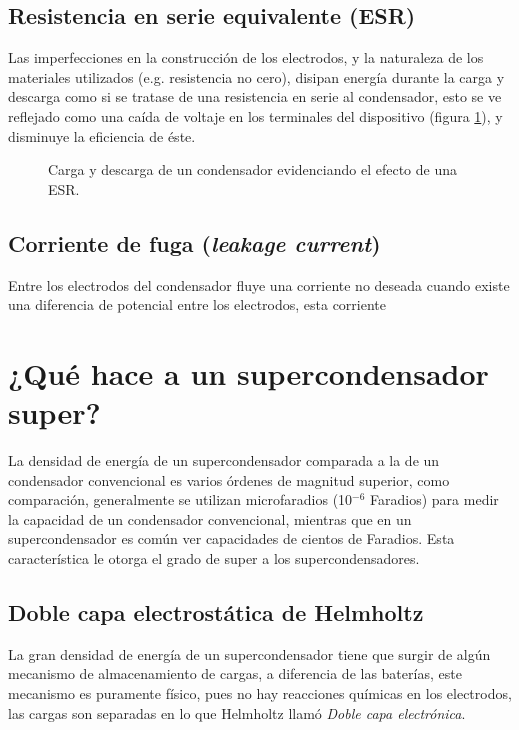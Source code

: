 \subsection{Resistencia en serie equivalente (ESR)}
Las imperfecciones en la construcción de los electrodos, y la naturaleza de los materiales utilizados (e.g. resistencia no cero), disipan energía durante la carga y descarga como si se tratase de una resistencia en serie al condensador, esto se ve reflejado como una caída de voltaje en los terminales del dispositivo (figura \ref{fig:plot:charge-discharge_esr}), y disminuye la eficiencia de éste.

\begin{figure}[h!]
	\caption{Carga y descarga de un condensador evidenciando el efecto de una ESR.}
	\label{fig:plot:charge-discharge_esr}
\end{figure}

\subsection{Corriente de fuga (\emph{leakage current})}
Entre los electrodos del condensador fluye una corriente no deseada cuando existe una diferencia de potencial entre los electrodos, esta corriente 

\section{¿Qué hace a un supercondensador super?}
La densidad de energía de un supercondensador comparada a la de un condensador convencional es varios órdenes de magnitud superior, como comparación, generalmente se utilizan microfaradios (10$^{-6}$ Faradios) para medir la capacidad de un condensador convencional, mientras que en un supercondensador es común ver capacidades de cientos de Faradios. Esta característica le otorga el grado de super a los supercondensadores.

\subsection{Doble capa electrostática de Helmholtz}
La gran densidad de energía de un supercondensador tiene que surgir de algún mecanismo de almacenamiento de cargas, a diferencia de las baterías, este mecanismo es puramente físico, pues no hay reacciones químicas en los electrodos, las cargas son separadas en lo que Helmholtz llamó \textit{Doble capa electrónica}.\citep{Frackowiak2001}

